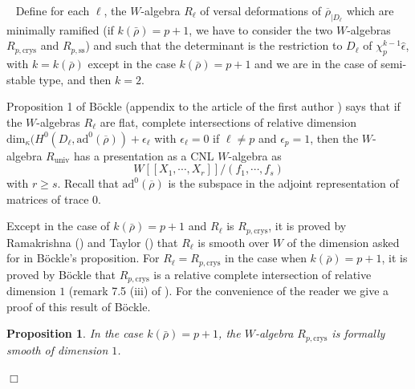 \documentclass[12pt]{article}
\newtheorem{prop}[theorem]{Proposition}
\newenvironment{proof}{\smallskip\noindent{\bf Proof.}\
}{$\Box$\smallskip\goodbreak}
\def\rhob{ {\bar {\rho} } }
\begin{document}
\begin{proof}
Define for each $\ell$, the $W$-algebra  $R_{\ell }$ of versal
deformations of $\overline{\rho}_{\mid D_{\ell }}$ which are
minimally ramified (if $k({\rhob} )=p+1$,
we have to consider the two $W$-algebras
$R_{p,\mathrm{crys} }$ and $R_{p,\mathrm{ss} }$)
and such that the determinant is the restriction
to $D_{\ell}$ of $\chi_p ^{k-1} \widehat{\epsilon}$,
with $k=k(\rhob )$ except in the case $k(\rhob )=p+1$
and we are in the case of semi-stable type, and then $k=2$.

Proposition 1 of B\"{o}ckle (appendix to
the article of the first author \cite{[K03]}) says that
if
the $W$-algebras  $R_{\ell }$ are flat,  complete intersections of
relative dimension $\mathrm{dim}_{\kappa }(H^0 (D_{\ell },
\mathrm{ad}^0 (\overline{\rho }))+\epsilon_{\ell }$ with
$\epsilon_{\ell}=0$ if $\ell \not= p$ and $\epsilon _{p }=1$, then
the $W$-algebra $R_{\mathrm{univ}}$ has a presentation as a CNL
$W$-algebra as $$W[[X_1,\cdots, X_r]]/(f_1,\cdots,f_s)$$ with $r \geq s$.
Recall that  $\mathrm{ad}^0 (\overline{\rho })$ is the subspace
in the adjoint representation of matrices of trace $0$.


Except in the case of $k({\rhob} )=p+1$
and $R_{\ell}$ is $R_{p,\mathrm{crys} }$, it is proved by Ramakrishna
(\cite{[R02]}) and Taylor (\cite{[T03ico]}) that
$R_{\ell}$ is smooth over $W$ of the  dimension
asked for in B\"{o}ckle's proposition.
For $R_{\ell}=R_{p,\mathrm{crys} }$ in the case when $k({\rhob}
)=p+1$,
it is proved by
B\"{o}ckle that $R_{p,\mathrm{crys} }$ is  a relative complete
intersection of relative dimension $1$ (remark 7.5 (iii)
of \cite{[B00]}). For the convenience of the reader we give a proof of
this result of B\"ockle.

\begin{prop}\label{p+1} In the case $k(\rhob)=p+1$, the $W$-algebra
$R_{p,\mathrm{crys} }$ is formally
smooth of dimension $1$. \end{prop}


\end{proof}
\end{document}
